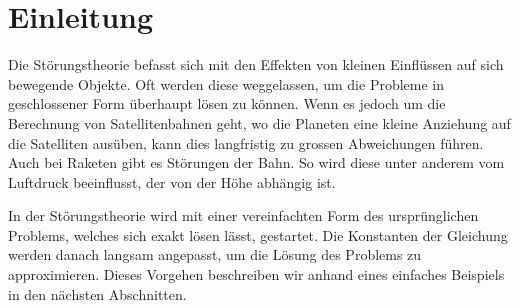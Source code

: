 \section{Einleitung\label{perturbation:section:einleitung}}
Die Störungstheorie befasst sich mit den Effekten von kleinen Einflüssen auf sich bewegende Objekte.
Oft werden diese weggelassen, um die Probleme in geschlossener Form überhaupt lösen zu können.
Wenn es jedoch um die Berechnung von Satellitenbahnen geht, wo die Planeten eine kleine Anziehung auf die Satelliten ausüben, kann dies langfristig zu grossen Abweichungen führen.
%
Auch bei Raketen gibt es Störungen der Bahn.
So wird diese unter anderem vom Luftdruck beeinflusst, der von der Höhe abhängig ist.
%

In der Störungstheorie wird mit einer vereinfachten Form des ursprünglichen Problems, welches sich exakt lösen lässt, gestartet.
Die Konstanten der Gleichung werden danach langsam angepasst, um die Lösung des Problems zu approximieren.
Dieses Vorgehen beschreiben wir anhand eines einfaches Beispiels in den nächsten Abschnitten.


